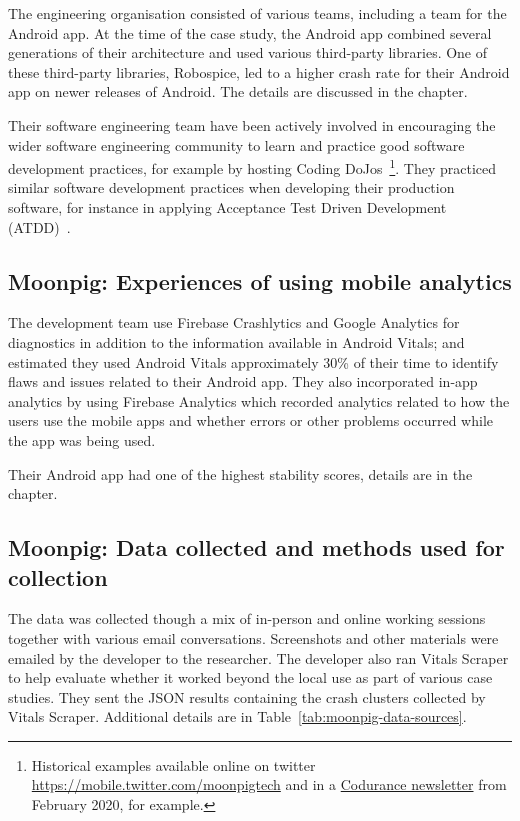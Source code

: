 The engineering organisation consisted of various teams, including a team for the Android app. At the time of the case study, the Android app combined several generations of their architecture and used various third-party libraries. One of these third-party libraries, Robospice, led to a higher crash rate for their Android app on newer releases of Android. The details are discussed in the  chapter.

Their software engineering team have been actively involved in encouraging the wider software engineering community to learn and practice good software development practices, for example by hosting Coding DoJos~\footnote{Historical examples available online on twitter \url{https://mobile.twitter.com/moonpigtech} and in a \href{https://www.codurance.com/publications/newsletters/2020-02-13-newsletter}{Codurance newsletter} from February 2020, for example.}. They practiced similar software development practices when developing their production software, for instance in applying Acceptance Test Driven Development (ATDD)~\citep{man2021_moonpig_atdd_part1}.

\subsection{Moonpig: Experiences of using mobile analytics}
The development team use Firebase Crashlytics and Google Analytics for diagnostics in addition to the information available in Android Vitals; and estimated they used Android Vitals approximately 30\% of their time to identify flaws and issues related to their Android app.
%
They also incorporated in-app analytics by using Firebase Analytics which recorded analytics related to how the users use the mobile apps and whether errors or other problems occurred while the app was being used. 

Their Android app had one of the highest stability scores, details are in the  chapter.

\subsection{Moonpig: Data collected and methods used for collection}
The data was collected though a mix of in-person and online working sessions together with various email conversations. Screenshots and other materials were emailed by the developer to the researcher. 
%
The developer also ran Vitals Scraper to help evaluate whether it worked beyond the local use as part of various case studies. They sent the JSON results containing the crash clusters collected by Vitals Scraper. Additional details are in Table~\ref{tab:moonpig-data-sources}.


